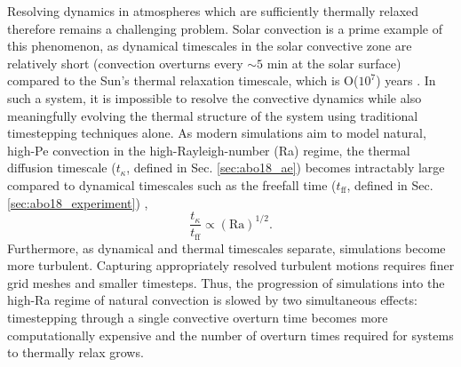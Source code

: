 Resolving dynamics in atmospheres which are sufficiently thermally relaxed therefore remains a challenging problem.
Solar convection is a prime example of this phenomenon, as dynamical timescales in the solar convective zone are relatively short (convection overturns every $\sim 5$ min at the solar surface) compared to the Sun's thermal relaxation timescale, which is O($10^7$) years \citep{stix2003}.  
In such a system, it is impossible to resolve the convective dynamics while also meaningfully evolving the thermal structure of the system using traditional timestepping techniques alone.
As modern simulations aim to model natural, high-Pe convection in the high-Rayleigh-number (Ra) regime, the thermal diffusion timescale ($t_{\kappa}$, defined in Sec. \ref{sec:abo18_ae}) becomes intractably large compared to dynamical timescales such as the freefall time ($t_{\text{ff}}$, defined in Sec. \ref{sec:abo18_experiment}) \citep{anders&brown2017}, 
\begin{equation}
\frac{t_{\kappa}}{t_{\text{ff}}} \propto (\text{Ra})^{1/2}.
\end{equation}
Furthermore, as dynamical and thermal timescales separate, simulations become more turbulent. Capturing appropriately resolved turbulent motions requires finer grid meshes and smaller timesteps.
Thus, the progression of simulations into the high-Ra regime of natural convection is slowed by two simultaneous effects: timestepping through a single convective overturn time becomes more computationally expensive and the number of overturn times required for systems to thermally relax grows.

